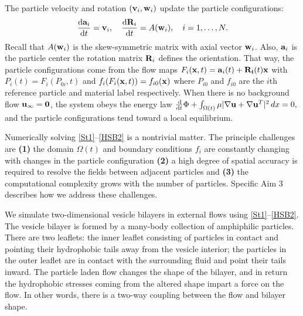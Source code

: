 The particle velocity and rotation $({\bf v}_i, {\bf w}_i)$ update the particle configurations:
\begin{alignat}{3}
\label{Hupdate1}   \frac{\dif {\bf a}_i}{\dif t} = {\bf v}_i,      \quad  \frac{\dif {\bf R}_i}{\dif t}  = A({\bf w}_i),\quad i = 1, \dots, N.
\end{alignat}
Recall that $A({\bf w}_i)$ is the skew-symmetric matrix with axial vector ${\bf w}_i$.
Also, ${\bf a}_i$ is the particle center the rotation matrix ${\bf R}_i$ defines the orientation.
That way, the particle configurations come from the flow maps $F_i({\bf x},t) = {\bf a}_i(t) + {\bf R_i}(t){\bf x}$ with
$P_i(t) = F_i(P_{0i},t)$ and $f_i(F_i({\bf x},t)) = f_{i0}({\bf x})$ where $P_{i0}$ and $f_{i0}$ are the $i$th reference particle
and material label respectively.
When there is no background flow ${\bf u}_{\infty} = {\bf 0}$, the system obeys the energy law
$\frac{\dif}{\dif t} \Phi + \int_{\Omega(t)} \mu |\nabla {\bf u} + \nabla {\bf u}^T|^2 \,dx = 0,$ 
and the particle configurations tend toward a local equilibrium.

Numerically solving \eqref{St1}--\eqref{HSB2} is a nontrivial matter.
The principle challenges are \textbf{(1)} the domain $\Omega(t)$ and boundary conditions $f_i$ are constantly changing
with changes in the particle configuration \textbf{(2)} a high degree of spatial accuracy is required to resolve the fields 
between adjacent particles and \textbf{(3)} the computational complexity grows with the number of particles. 
Specific Aim 3 describes how we address these challenges. 

We simulate two-dimensional vesicle bilayers in external flows using \eqref{St1}--\eqref{HSB2}.
The vesicle bilayer is formed by a many-body collection of amphiphilic particles. There are two leaflets: 
the inner leaflet consisting of particles in contact and pointing their hydrophobic tails away from the vesicle interior;
the particles in the outer leaflet are in contact with the surrounding fluid and point their tails inward.
The particle laden flow changes the shape of the bilayer, and in return the hydrophobic stresses coming from the altered shape 
impart a force on the flow. In other words, there is a two-way coupling between the flow and bilayer shape. 

